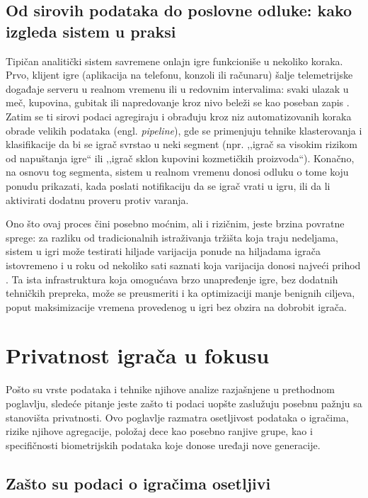 \documentclass[12pt]{article}
\begin{document}
\subsection{Od sirovih podataka do poslovne odluke: kako izgleda sistem u praksi}

Tipičan analitički sistem savremene onlajn igre funkcioniše u nekoliko koraka. Prvo, klijent igre (aplikacija na telefonu, konzoli ili računaru) šalje telemetrijske događaje serveru u realnom vremenu ili u redovnim intervalima: svaki ulazak u meč, kupovina, gubitak ili napredovanje kroz nivo beleži se kao poseban zapis \cite{drachen2013}. Zatim se ti sirovi podaci agregiraju i obrađuju kroz niz automatizovanih koraka obrade velikih podataka (engl. \textit{pipeline}), gde se primenjuju tehnike klasterovanja i klasifikacije da bi se igrač svrstao u neki segment (npr. ,,igrač sa visokim rizikom od napuštanja igre`` ili ,,igrač sklon kupovini kozmetičkih proizvoda``). Konačno, na osnovu tog segmenta, sistem u realnom vremenu donosi odluku o tome koju ponudu prikazati, kada poslati notifikaciju da se igrač vrati u igru, ili da li aktivirati dodatnu proveru protiv varanja.

Ono što ovaj proces čini posebno moćnim, ali i rizičnim, jeste brzina povratne sprege: za razliku od tradicionalnih istraživanja tržišta koja traju nedeljama, sistem u igri može testirati hiljade varijacija ponude na hiljadama igrača istovremeno i u roku od nekoliko sati saznati koja varijacija donosi najveći prihod \cite{bourdoucen2023}. Ta ista infrastruktura koja omogućava brzo unapređenje igre, bez dodatnih tehničkih prepreka, može se preusmeriti i ka optimizaciji manje benignih ciljeva, poput maksimizacije vremena provedenog u igri bez obzira na dobrobit igrača.

\section{Privatnost igrača u fokusu}\label{sec:privatnost}

Pošto su vrste podataka i tehnike njihove analize razjašnjene u prethodnom poglavlju, sledeće pitanje jeste zašto ti podaci uopšte zaslužuju posebnu pažnju sa stanovišta privatnosti. Ovo poglavlje razmatra osetljivost podataka o igračima, rizike njihove agregacije, položaj dece kao posebno ranjive grupe, kao i specifičnosti biometrijskih podataka koje donose uređaji nove generacije.
\subsection{Zašto su podaci o igračima osetljivi}
\end{document}
